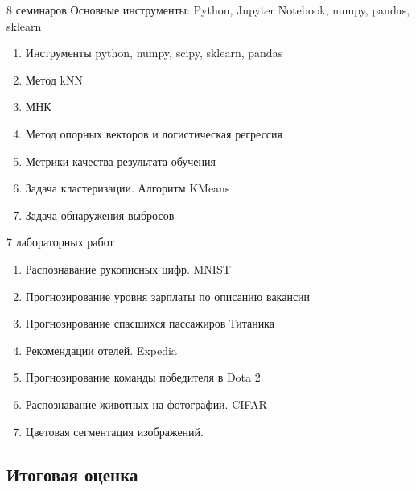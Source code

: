 \documentclass{beamer}
\begin{document}
\begin{frame}{8 семинаров}
    Основные инструменты: Python, Jupyter Notebook, numpy, pandas, sklearn
    \begin{enumerate}
        \item Инструменты python, numpy, scipy, sklearn, pandas
        \item Метод kNN
        \item МНК
        \item Метод опорных векторов и логистическая регрессия
        \item Метрики качества результата обучения
        \item Задача кластеризации. Алгоритм KMeans
        \item Задача обнаружения выбросов
    \end{enumerate}
\end{frame}

\begin{frame}{7 лабораторных работ}
    \begin{enumerate}
        \item Распознавание рукописных цифр. MNIST
        \item Прогнозирование уровня зарплаты по описанию вакансии
        \item Прогнозирование спасшихся пассажиров Титаника
        \item Рекомендации отелей. Expedia
        \item Прогнозирование команды победителя в Dota 2
        \item Распознавание животных на фотографии. CIFAR
        \item Цветовая сегментация изображений.
    \end{enumerate}
\end{frame}

\subsection{Итоговая оценка}
\end{document}
